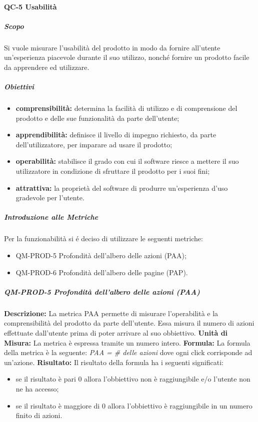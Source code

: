		\paragraph{QC-5 Usabilità}
			\subparagraph{Scopo}
			Si vuole misurare l'usabilità del prodotto in modo da fornire all'utente un'esperienza piacevole durante il suo utilizzo, nonché fornire un prodotto facile da apprendere ed utilizzare.
			\subparagraph{Obiettivi}
				\begin{itemize}
					\item \textbf{comprensibilità:} determina la facilità di utilizzo e di comprensione del prodotto e delle sue funzionalità da parte dell'utente;
					\item \textbf{apprendibilità:} definisce il livello di impegno richiesto, da parte dell'utilizzatore, per imparare ad usare il prodotto;
					\item \textbf{operabilità:} stabilisce il grado con cui il software riesce a mettere il suo utilizzatore in condizione di sfruttare il prodotto per i suoi fini;
					\item \textbf{attrattiva:} la proprietà del software di produrre un'esperienza d'uso gradevole per l'utente.
				\end{itemize}
			\subparagraph{Introduzione alle Metriche}
				Per la funzionabilità si é deciso di utilizzare le seguenti metriche:
				\begin{itemize}
					\item QM-PROD-5 Profondità dell'albero delle azioni (PAA);
					\item QM-PROD-6 Profondità dell'albero delle pagine (PAP).
				\end{itemize}
			\subparagraph{QM-PROD-5 Profondità dell'albero delle azioni (PAA)}
				\textbf{Descrizione: }
					La metrica PAA permette di misurare l'operabilità e la comprensibilità del prodotto da parte dell'utente. Essa misura il numero di azioni effettuate dall'utente prima di poter arrivare al suo obbiettivo.
				\textbf{Unità di Misura: }
					La metrica è espressa tramite un numero intero.
				\textbf{Formula: }
					La formula della metrica è la seguente:
					\textit{PAA = \# delle azioni}
					dove ogni click corrisponde ad un'azione.
				\textbf{Risultato: }
					Il risultato della formula ha i seguenti significati:
					\begin{itemize}
						\item se il risultato è pari 0 allora l'obbiettivo non è raggiungibile e/o l'utente non ne ha accesso;
						\item se il risultato è maggiore di 0 allora l'obbiettivo è raggiungibile in un numero finito di azioni.
					\end{itemize}
